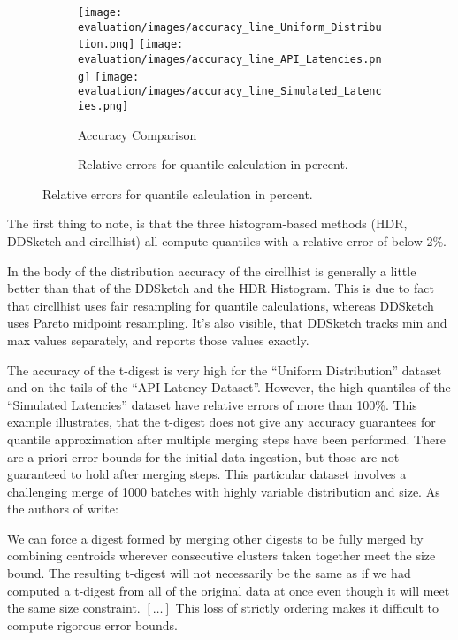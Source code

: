 \documentclass{article}
\theoremstyle{plain}
\theoremstyle{remark}
\begin{document}
\begin{figure}
  \begin{subfigure}{\textwidth}
    \texttt{[image: evaluation/images/accuracy\_line\_Uniform\_Distribution.png]}
    \texttt{[image: evaluation/images/accuracy\_line\_API\_Latencies.png]}
    \texttt{[image: evaluation/images/accuracy\_line\_Simulated\_Latencies.png]}
    \caption{Accuracy Comparison}
    \label{fig:acc}
  \end{subfigure}
  \begin{subfigure}{\textwidth}
    \begin{minipage}{\textwidth}
      \scriptsize
      
    \end{minipage}
    \caption{Relative errors for quantile calculation in percent.}
    \label{tab:acc}
  \end{subfigure}
\end{figure}

The first thing to note, is that the three histogram-based methods (HDR, DDSketch and circllhist)
all compute quantiles with a relative error of below 2\%.

In the body of the distribution accuracy of the circllhist is generally a little better than that of
the DDSketch and the HDR Histogram.  This is due to fact that circllhist uses fair resampling for
quantile calculations, whereas DDSketch uses Pareto midpoint resampling.  It's also visible, that
DDSketch tracks min and max values separately, and reports those values exactly.

The accuracy of the t-digest is very high for the ``Uniform Distribution'' dataset and on the tails
of the ``API Latency Dataset''. However, the high quantiles of the ``Simulated Latencies'' dataset
have relative errors of more than 100\%. This example illustrates, that the t-digest does not give
any accuracy guarantees for quantile approximation after multiple merging steps have been performed.
There are a-priori error bounds for the initial data ingestion, but those are not guaranteed to hold
after merging steps. This particular dataset involves a challenging merge of 1000 batches with
highly variable distribution and size. As the authors of \cite{tdigest} write:

\begin{displayquote}
  We can force a digest formed by merging other digests to be fully merged by combining centroids
  wherever consecutive clusters taken together meet the size bound. The resulting t-digest will not
  necessarily be the same as if we had computed a t-digest from all of the original data at once
  even though it will meet the same size constraint. $[\dots]$ This loss of strictly ordering makes
  it difficult to compute rigorous error bounds.
\end{displayquote}
\end{document}
